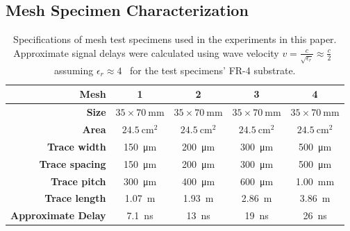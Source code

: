 \documentclass[final]{iacrtrans}
\newcommand{\partno}[1]{\textsf{\small#1}}
\begin{document}
\subsection{Mesh Specimen Characterization}

\begin{table}
    \begin{center}
        \begin{tabular}{r|cccc}
            \textbf{Mesh}
            &1
            &2
            &3
            &4\\\hline

            \textbf{Size}&
            $35\times\qty{70}{\milli\meter}$&
            $35\times\qty{70}{\milli\meter}$&
            $35\times\qty{70}{\milli\meter}$&
            $35\times\qty{70}{\milli\meter}$\\

            \textbf{Area}&
            $\qty{24.5}{\centi\meter^2}$&
            $\qty{24.5}{\centi\meter^2}$&
            $\qty{24.5}{\centi\meter^2}$&
            $\qty{24.5}{\centi\meter^2}$\\\hline

            \textbf{Trace width}&
            \qty{150}{\micro\meter}&
            \qty{200}{\micro\meter}&
            \qty{300}{\micro\meter}&
            \qty{500}{\micro\meter}\\

            \textbf{Trace spacing}&
            \qty{150}{\micro\meter}&
            \qty{200}{\micro\meter}&
            \qty{300}{\micro\meter}&
            \qty{500}{\micro\meter}\\

            \textbf{Trace pitch}&
            \qty{300}{\micro\meter}&
            \qty{400}{\micro\meter}&
            \qty{600}{\micro\meter}&
            \qty{1.00}{\milli\meter}\\\hline

            \textbf{Trace length}&
            \qty{1.07}{\meter}&
            \qty{1.93}{\meter}&
            \qty{2.86}{\meter}&
            \qty{3.86}{\meter}\\

            \textbf{Approximate Delay}&
            \qty{7.1}{\nano\second}&
            \qty{13}{\nano\second}&
            \qty{19}{\nano\second}&
            \qty{26}{\nano\second}\\
        \end{tabular}
    \end{center}
    \caption{Specifications of mesh test specimens used in the experiments in this paper. Approximate signal delays were
        calculated using wave velocity
        $v=\frac{c}{\sqrt{\epsilon_r}}\approx\frac{c}{2}$~\cite{wheelerTransmissionLinePropertiesParallel1965} assuming
        $\epsilon_r\approx 4$~\cite{mumbyDielectricPropertiesFR41989} for the test specimens' \partno{FR-4} substrate.}
    \label{tab_mesh_spec}
\end{table}
\end{document}
